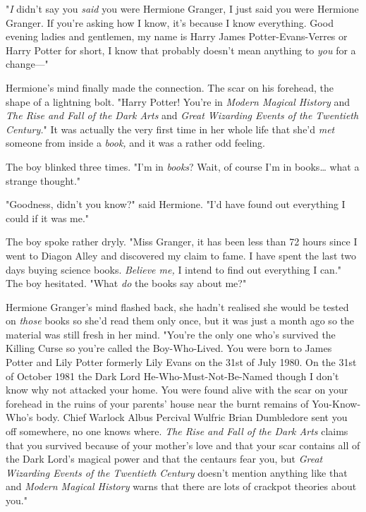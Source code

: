 "\emph{I} didn't say you \emph{said} you were Hermione Granger, I just said you
were Hermione Granger. If you're asking how I know, it's because I know
everything. Good evening ladies and gentlemen, my name is Harry James
Potter-Evans-Verres or Harry Potter for short, I know that probably doesn't
mean anything to \emph{you} for a change---"

Hermione's mind finally made the connection. The scar on his forehead, the
shape of a lightning bolt. "Harry Potter! You're in \emph{Modern Magical
History} and \emph{The Rise and Fall of the Dark Arts} and \emph{Great
Wizarding Events of the Twentieth Century.}" It was actually the very first
time in her whole life that she'd \emph{met} someone from inside a \emph{book,}
and it was a rather odd feeling.

The boy blinked three times. "I'm in \emph{books}? Wait, of course I'm in
books{\ldots} what a strange thought."

"Goodness, didn't you know?" said Hermione. "I'd have found out everything I
could if it was me."

The boy spoke rather dryly. "Miss Granger, it has been less than 72 hours since
I went to Diagon Alley and discovered my claim to fame. I have spent the last
two days buying science books. \emph{Believe me,} I intend to find out
everything I can." The boy hesitated. "What \emph{do} the books say about me?"

Hermione Granger's mind flashed back, she hadn't realised she would be tested
on \emph{those} books so she'd read them only once, but it was just a month ago
so the material was still fresh in her mind. "You're the only one who's
survived the Killing Curse so you're called the Boy-Who-Lived. You were born to
James Potter and Lily Potter formerly Lily Evans on the 31st of July 1980. On
the 31st of October 1981 the Dark Lord He-Who-Must-Not-Be-Named though I don't
know why not attacked your home. You were found alive with the scar on your
forehead in the ruins of your parents' house near the burnt remains of
You-Know-Who's body. Chief Warlock Albus Percival Wulfric Brian Dumbledore sent
you off somewhere, no one knows where. \emph{The Rise and Fall of the Dark
Arts} claims that you survived because of your mother's love and that your scar
contains all of the Dark Lord's magical power and that the centaurs fear you,
but \emph{Great Wizarding Events of the Twentieth Century} doesn't mention
anything like that and \emph{Modern Magical History} warns that there are lots
of crackpot theories about you."

